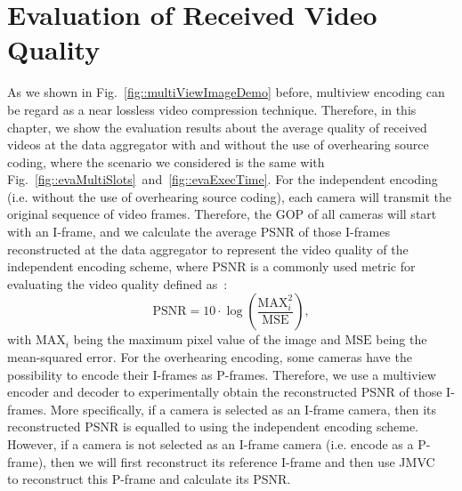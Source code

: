 \section{Evaluation of Received Video Quality}
As we shown in Fig.~\ref{fig::multiViewImageDemo} before, multiview encoding can be regard as a near lossless video compression technique.
Therefore, in this chapter, we show the evaluation results about the average quality of received videos at the data aggregator with and without the use of overhearing source coding, where the scenario we considered is the same with Fig.~\ref{fig::evaMultiSlots}~and~\ref{fig::evaExecTime}.
For the independent encoding (i.e. without the use of overhearing source coding), each camera will transmit the original sequence of video frames.
Therefore, the GOP of all cameras will start with an I-frame, and we calculate the average PSNR of those I-frames reconstructed at the data aggregator to represent the video quality of the independent encoding scheme, where PSNR is a commonly used metric for evaluating the video quality defined as~\cite{PSNRDef}:
\begin{equation}
\text{PSNR} = 10 \cdot \log \left( \frac{\text{MAX}^2_i}{\text{MSE}} \right),
\end{equation}
with $\text{MAX}_i$ being the maximum pixel value of the image and $\text{MSE}$ being the mean-squared error.
%
For the overhearing encoding, some cameras have the possibility to encode their I-frames as P-frames.
Therefore, we use a multiview encoder and decoder to experimentally obtain the reconstructed PSNR of those I-frames.
More specifically, if a camera is selected as an I-frame camera, then its reconstructed PSNR is equalled to using the independent encoding scheme.
However, if a camera is not selected as an I-frame camera (i.e. encode as a P-frame), then we will first reconstruct its reference I-frame and then use JMVC~\cite{JMVC} to reconstruct this P-frame and calculate its PSNR.

